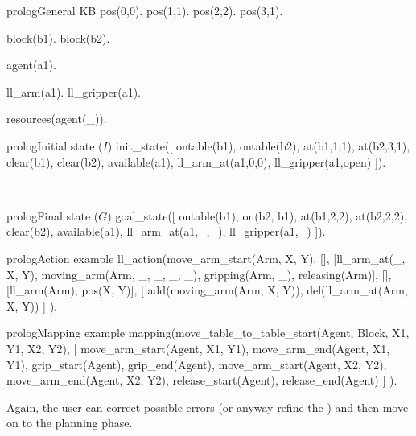 \begin{center}
\begin{minipage}{\linewidth}
    \begin{minipage}{.48\linewidth}
        \begin{codebox}{prolog}{General KB}
pos(0,0).
pos(1,1).
pos(2,2).
pos(3,1).

block(b1).
block(b2).

agent(a1).

ll_arm(a1).
ll_gripper(a1).

resources(agent(_)).
        \end{codebox}
    \end{minipage}
    \hfill
    \begin{minipage}{.48\linewidth}
        \begin{minipage}{\linewidth}
        \begin{codebox}{prolog}{Initial state ($I$)}
init_state([
  ontable(b1), ontable(b2),
  at(b1,1,1), at(b2,3,1),
  clear(b1), clear(b2),
  available(a1),
  ll_arm_at(a1,0,0), 
  ll_gripper(a1,open) 
]).
        \end{codebox}
        \end{minipage}
        \hspace{1cm}\\
        \begin{minipage}{\linewidth}
        \begin{codebox}{prolog}{Final state ($G$)}
goal_state([
  ontable(b1),
  on(b2, b1),
  at(b1,2,2), at(b2,2,2),
  clear(b2),
  available(a1),
  ll_arm_at(a1,_,_), 
  ll_gripper(a1,_)    
]).
        \end{codebox}
        \end{minipage}
    \end{minipage}
\end{minipage}
\begin{codebox}{prolog}{Action example}
ll_action(move_arm_start(Arm, X, Y),
  [],
  [ll_arm_at(_, X, Y), moving_arm(Arm, _, _, _, _), gripping(Arm, _), releasing(Arm)],
  [],
  [ll_arm(Arm), pos(X, Y)],
  [
    add(moving_arm(Arm, X, Y)),
    del(ll_arm_at(Arm, X, Y))
  ]
).
\end{codebox}
\begin{codebox}{prolog}{Mapping example}
mapping(move_table_to_table_start(Agent, Block, X1, Y1, X2, Y2),
  [
    move_arm_start(Agent, X1, Y1),
    move_arm_end(Agent, X1, Y1),
    grip_start(Agent),
    grip_end(Agent),
    move_arm_start(Agent, X2, Y2),
    move_arm_end(Agent, X2, Y2),
    release_start(Agent),
    release_end(Agent)
  ]
).
\end{codebox}
\end{center}

Again, the user can correct possible errors (or anyway refine the \kb) and then move on to the planning phase.
